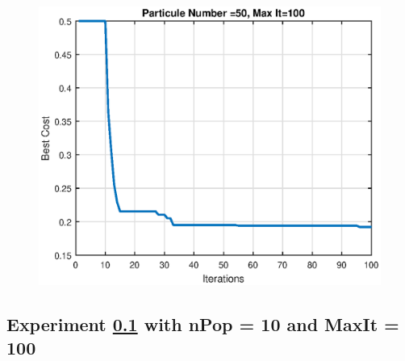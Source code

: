 \begin{figure}[H]
	\begin{minipage}[b]{0.5\linewidth}
	\centering
	\includegraphics[width=\textwidth]{../figures/ares.eps}
	\caption{}
	\label{}
	\end{minipage}\hfill
	\begin{minipage}[b]{0.5\textwidth}
	
	\caption{}
	\label{}
	\end{minipage}
\end{figure}
\subsection{Experiment \ref{exp:exp10100} with nPop = 10 and MaxIt = 100}\label{exp:exp10100}

